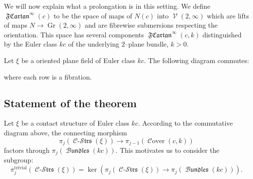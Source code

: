 \documentclass[10pt]{amsart}
\newcommand{\Gr}{\operatorname{Gr}}
\newcommand{\V}{\operatorname{\mathcal{V}}}
\newcommand{\Cover}{\operatorname{\mathcal{C}over}}
\newcommand{\trivial}{{\operatorname{trivial}}}
\newcommand{\Cartan}{\operatorname{\mathfrak{Cartan}}}
\newcommand{\FCartan}{\operatorname{\mathfrak{FCartan}}}
\newcommand{\Cont}{\operatorname{\mathcal{C}-\mathcal{S}\mathfrak{trs}}}
\newcommand{\Planes}{\operatorname{\mathcal{P}\mathfrak{lanes}}}
\newcommand{\Bundles}{\operatorname{\mathcal{B}\mathfrak{undles}}}
\theoremstyle{definition}
\begin{document}
We will now explain what a prolongation is in this setting. We define $\FCartan^\infty(c)$ to be the space of maps of $N(c)$ into $\V(2,\infty)$ which are lifts of maps $N \to \Gr(2,\infty)$ and are fibrewise submersions respecting the orientation. This space has several components $\FCartan^\infty(c,k)$ distinguished by the Euler class $kc$ of the underlying $2$--plane bundle, $k>0$. 

Let $\xi$ be a oriented plane field of Euler class $kc$. The following diagram commutes:
\vspace{-0.2cm}
\begin{figure}[H] \label{diag:fibrations}
\centering
{}
\end{figure}
\vspace{-0.6cm}
where each row is a fibration. 



\subsection{Statement of the theorem}

Let $\xi$ be a contact structure of Euler class $kc$. According to the commutative diagram above, the connecting morphism
\[ \pi_j(\Cont(\xi)) \to \pi_{j-1}(\Cover(c,k)) \]
factors through $\pi_j(\Bundles(kc))$. This motivates us to consider the subgroup:
\[ \pi_j^\trivial(\Cont(\xi)) = \ker(\pi_j(\Cont(\xi)) \to \pi_j(\Bundles(kc))). \]
\end{document}
